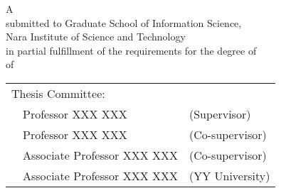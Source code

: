 \renewcommand\thepage{Title2}
\thispagestyle{empty}
\vspace*{8.9truecm}
\begin{center}
 A \edoctitle \\
 submitted to Graduate School of Information Science, \\
 Nara Institute of Science and Technology \\
 in partial fulfillment of the requirements for the degree of \\
 {\degree} of \major \\
 \bigskip

 \eauthor

 \vspace*{4.8truemm}

 \centering
 \begin{tabular}[t]{p{}ll}
  \multicolumn{2}{l}{Thesis Committee:} \\
  & Professor XXX XXX & (Supervisor) \\
  & Professor XXX XXX & (Co-supervisor) \\
  & Associate Professor XXX XXX & (Co-supervisor) \\
  & Associate Professor XXX XXX & (YY University)
 \end{tabular}
\end{center}